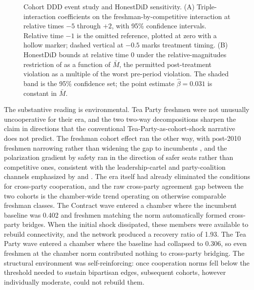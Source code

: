 \documentclass[12pt, a4paper]{article}
\begin{document}
\begin{figure}[H]
\begin{tikzpicture}
\end{tikzpicture}
\caption{Cohort DDD event study and HonestDiD sensitivity. (A) Triple-interaction coefficients on the freshman-by-competitive interaction at relative times $-5$ through $+2$, with 95\% confidence intervals. Relative time $-1$ is the omitted reference, plotted at zero with a hollow marker; dashed vertical at $-0.5$ marks treatment timing. (B) HonestDiD bounds at relative time $0$ under the relative-magnitudes restriction of \citet{rambachan2023honest} as a function of $\bar{M}$, the permitted post-treatment violation as a multiple of the worst pre-period violation. The shaded band is the 95\% confidence set; the point estimate $\hat\beta = 0.031$ is constant in $\bar{M}$.}
\label{fig:ddd_event_study}
\end{figure}

The substantive reading is environmental. Tea Party freshmen were not unusually uncooperative for their era, and the two two-way decompositions sharpen the claim in directions that the conventional Tea-Party-as-cohort-shock narrative does not predict. The freshman cohort effect ran the other way, with post-2010 freshmen narrowing rather than widening the gap to incumbents \citep{bafumi2010leapfrog}, and the polarization gradient by safety ran in the direction of safer seats rather than competitive ones, consistent with the leadership-cartel and party-coalition channels emphasized by \citet{lee2009beyond} and \citet{cox2005setting}. The era itself had already eliminated the conditions for cross-party cooperation, and the raw cross-party agreement gap between the two cohorts is the chamber-wide trend operating on otherwise comparable freshman classes. The Contract wave entered a chamber where the incumbent baseline was 0.402 and freshmen matching the norm automatically formed cross-party bridges. When the initial shock dissipated, these members were available to rebuild connectivity, and the network produced a recovery ratio of 1.93. The Tea Party wave entered a chamber where the baseline had collapsed to 0.306, so even freshmen at the chamber norm contributed nothing to cross-party bridging. The structural environment was self-reinforcing: once cooperation norms fell below the threshold needed to sustain bipartisan edges, subsequent cohorts, however individually moderate, could not rebuild them.
\end{document}
